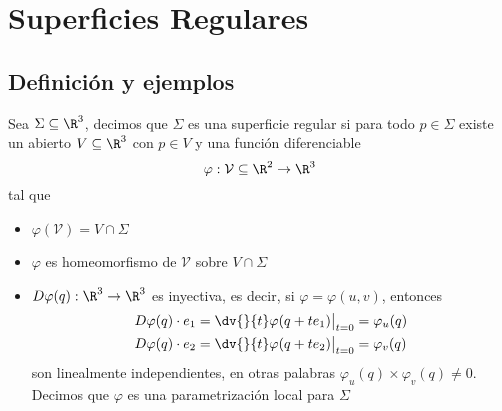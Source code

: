 \documentclass{article}
\begin{document}
\newpage

\section{Superficies Regulares}
\subsection{Definición y ejemplos}
\begin{dfn}
    Sea $\Sigma\subseteq\R^{3}$, decimos que $\Sigma$ es una superficie regular si para todo
    $p\in\Sigma$ existe un abierto $V\subseteq\R^{3}$ con $p\in V$ y una función diferenciable
    \begin{equation*}
        \varphi:\mathcal{V}\subseteq\R^{2}\to\R^{3}
    \end{equation*}
    tal que
    \begin{itemize}
        \item $\varphi(\mathcal{V})=V\cap\Sigma$
        \item $\varphi$ es homeomorfismo de $\mathcal{V}$ sobre $V\cap\Sigma$
        \item $D\varphi(q):\R^{3}\to\R^{3}$ es inyectiva, es decir, si $\varphi=\varphi(u,v)$, 
        entonces
        \begin{align*}
            & D\varphi(q)\cdot e_{1}=\dv{}{t}\varphi(q+te_{1})\big|_{t=0}=\varphi_{u}(q) \\
            & D\varphi(q)\cdot e_{2}=\dv{}{t}\varphi(q+te_{2})\big|_{t=0}=\varphi_{v}(q)
        \end{align*}
        son linealmente independientes, en otras palabras 
        $\varphi_{u}(q)\times\varphi_{v}(q)\neq0$. Decimos que $\varphi$ es una parametrización 
        local para $\Sigma$
    \end{itemize}
\end{dfn}
\end{document}
